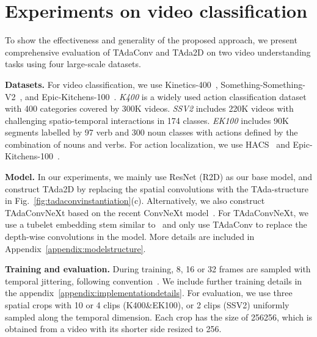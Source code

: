 \documentclass{article} \usepackage{iclr2022_conference,times}
\def\x{}
\begin{document}
\section{Experiments on video classification}
To show the effectiveness and generality of the proposed approach, we present comprehensive evaluation of TAdaConv and TAda2D on two video understanding tasks using four large-scale datasets.

\textbf{Datasets.}
For video classification, we use Kinetics-400~\citep{kinetics400}, Something-Something-V2~\citep{ssv2}, and Epic-Kitchens-100~\citep{ek100}. \textit{K400} is a widely used action classification dataset with 400 categories covered by 300K videos.
\textit{SSV2} includes 220K videos with challenging spatio-temporal interactions in 174 classes.
\textit{EK100} includes 90K segments labelled by 97 verb and 300 noun classes with actions defined by the combination of nouns and verbs. For action localization, we use HACS~\citep{hacs} and Epic-Kitchens-100~\citep{ek100}.

\textbf{Model.} In our experiments, we mainly use ResNet (R2D) as our base model, and construct TAda2D by replacing the spatial convolutions with the TAda-structure in Fig.~\ref{fig:tadaconvinstantiation}(c).
Alternatively, we also construct TAdaConvNeXt based on the recent ConvNeXt model~\citep{convnext}. For TAdaConvNeXt, we use a tubelet embedding stem similar to~\citep{arnab2021vivit} and only use TAdaConv to replace the depth-wise convolutions in the model. More details are included in Appendix~\ref{appendix:modelstructure}.

\textbf{Training and evaluation.} 
During training, 8, 16 or 32 frames are sampled with temporal jittering,
following convention~\citep{tsm,tam,slowfast}. 
We include further training details in the appendix~\ref{appendix:implementationdetails}.
For evaluation, we use three spatial crops with 10 or 4 clips (K400\&EK100), or 2 clips (SSV2) uniformly sampled along the temporal dimension. 
Each crop has the size of 256\x256, which is obtained from a video with its shorter side resized to 256.
\end{document}
